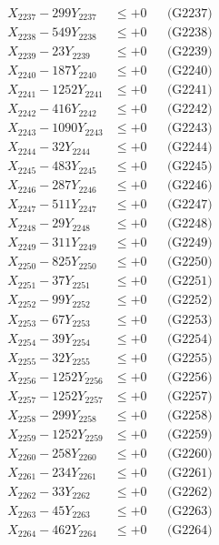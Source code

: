 \documentclass[a4paper,10pt]{article}
\begin{document}
{\begin{align}
X_{2237} - 299Y_{2237} &\leq +0 && \text{(G2237)} \\
X_{2238} - 549Y_{2238} &\leq +0 && \text{(G2238)} \\
X_{2239} - 23Y_{2239} &\leq +0 && \text{(G2239)} \\
X_{2240} - 187Y_{2240} &\leq +0 && \text{(G2240)} \\
\allowbreak
X_{2241} - 1252Y_{2241} &\leq +0 && \text{(G2241)} \\
X_{2242} - 416Y_{2242} &\leq +0 && \text{(G2242)} \\
X_{2243} - 1090Y_{2243} &\leq +0 && \text{(G2243)} \\
X_{2244} - 32Y_{2244} &\leq +0 && \text{(G2244)} \\
X_{2245} - 483Y_{2245} &\leq +0 && \text{(G2245)} \\
X_{2246} - 287Y_{2246} &\leq +0 && \text{(G2246)} \\
X_{2247} - 511Y_{2247} &\leq +0 && \text{(G2247)} \\
X_{2248} - 29Y_{2248} &\leq +0 && \text{(G2248)} \\
X_{2249} - 311Y_{2249} &\leq +0 && \text{(G2249)} \\
X_{2250} - 825Y_{2250} &\leq +0 && \text{(G2250)} \\
\allowbreak
X_{2251} - 37Y_{2251} &\leq +0 && \text{(G2251)} \\
X_{2252} - 99Y_{2252} &\leq +0 && \text{(G2252)} \\
X_{2253} - 67Y_{2253} &\leq +0 && \text{(G2253)} \\
X_{2254} - 39Y_{2254} &\leq +0 && \text{(G2254)} \\
X_{2255} - 32Y_{2255} &\leq +0 && \text{(G2255)} \\
X_{2256} - 1252Y_{2256} &\leq +0 && \text{(G2256)} \\
X_{2257} - 1252Y_{2257} &\leq +0 && \text{(G2257)} \\
X_{2258} - 299Y_{2258} &\leq +0 && \text{(G2258)} \\
X_{2259} - 1252Y_{2259} &\leq +0 && \text{(G2259)} \\
X_{2260} - 258Y_{2260} &\leq +0 && \text{(G2260)} \\
\allowbreak
X_{2261} - 234Y_{2261} &\leq +0 && \text{(G2261)} \\
X_{2262} - 33Y_{2262} &\leq +0 && \text{(G2262)} \\
X_{2263} - 45Y_{2263} &\leq +0 && \text{(G2263)} \\
X_{2264} - 462Y_{2264} &\leq +0 && \text{(G2264)} \\

\end{align}}
\end{document}
